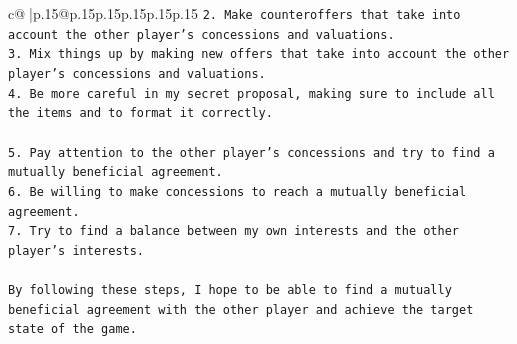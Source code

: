 \documentclass{article}
\begin{document}
{\begin{supertabular}{c@{$\;$}|p{.15\linewidth}@{}p{.15\linewidth}p{.15\linewidth}p{.15\linewidth}p{.15\linewidth}p{.15\linewidth}}
{{{\texttt{2. Make counteroffers that take into account the other player's concessions and valuations.} \\
\texttt{3. Mix things up by making new offers that take into account the other player's concessions and valuations.} \\
\texttt{4. Be more careful in my secret proposal, making sure to include all the items and to format it correctly.} \\
\\ 
\texttt{5. Pay attention to the other player's concessions and try to find a mutually beneficial agreement.} \\
\texttt{6. Be willing to make concessions to reach a mutually beneficial agreement.} \\
\texttt{7. Try to find a balance between my own interests and the other player's interests.} \\
\\ 
\texttt{By following these steps, I hope to be able to find a mutually beneficial agreement with the other player and achieve the target state of the game.} \\
            }
        }
    }
     \\ \\

\end{supertabular}
}
\end{document}
